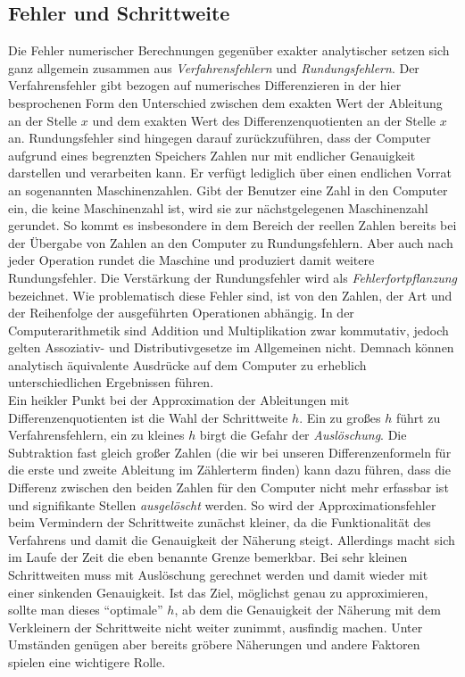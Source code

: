 \documentclass{scrartcl}
\begin{document}
\subsection{Fehler und Schrittweite}
\label{ssec:schrittweite}
Die Fehler numerischer Berechnungen gegenüber exakter analytischer setzen sich ganz allgemein zusammen aus \textit{Verfahrensfehlern} und \textit{Rundungsfehlern}.\cite{westermann} Der Verfahrensfehler gibt bezogen auf numerisches Differenzieren in der hier besprochenen Form den Unterschied zwischen dem exakten Wert der Ableitung an der Stelle $x$ und dem exakten Wert des Differenzenquotienten an der Stelle $x$ an. Rundungsfehler sind hingegen darauf zurückzuführen, dass der Computer aufgrund eines begrenzten Speichers Zahlen nur mit endlicher Genauigkeit darstellen und verarbeiten kann. Er verfügt lediglich über einen endlichen Vorrat an sogenannten Maschinenzahlen. Gibt der Benutzer eine Zahl in den Computer ein, die keine Maschinenzahl ist, wird sie zur nächstgelegenen Maschinenzahl gerundet. So kommt es insbesondere in dem Bereich der reellen Zahlen bereits bei der Übergabe von Zahlen an den Computer zu Rundungsfehlern. Aber auch nach jeder Operation rundet die Maschine und produziert damit weitere Rundungsfehler. Die Verstärkung der Rundungsfehler wird als \textit{Fehlerfortpflanzung} bezeichnet. Wie problematisch diese Fehler sind, ist von den Zahlen, der Art und der Reihenfolge der ausgeführten Operationen abhängig. In der Computerarithmetik sind Addition und Multiplikation zwar kommutativ, jedoch gelten Assoziativ- und Distributivgesetze im Allgemeinen nicht. Demnach können analytisch äquivalente Ausdrücke auf dem Computer zu erheblich unterschiedlichen Ergebnissen führen.\cite{nla} \\
Ein heikler Punkt bei der Approximation der Ableitungen mit Differenzenquotienten ist die Wahl der Schrittweite $h$. Ein zu großes $h$ führt zu Verfahrensfehlern, ein zu kleines $h$ birgt die Gefahr der \textit{Auslöschung}. Die Subtraktion fast gleich großer Zahlen (die wir bei unseren Differenzenformeln für die erste und zweite Ableitung im Zählerterm finden) kann dazu führen, dass die Differenz zwischen den beiden Zahlen für den Computer nicht mehr erfassbar ist und signifikante Stellen \textit{ausgelöscht} werden.\cite{am}
So wird der Approximationsfehler beim Vermindern der Schrittweite zunächst kleiner, da die Funktionalität des Verfahrens und damit die Genauigkeit der Näherung steigt.
Allerdings macht sich im Laufe der Zeit die eben benannte Grenze bemerkbar. Bei sehr kleinen Schrittweiten muss mit Auslöschung gerechnet werden und damit wieder mit einer sinkenden Genauigkeit.\cite{schneebeli}
Ist das Ziel, möglichst genau zu approximieren, sollte man dieses "`optimale"' $h$, ab dem die Genauigkeit der Näherung mit dem Verkleinern der Schrittweite nicht weiter zunimmt, ausfindig machen. Unter Umständen genügen aber bereits gröbere Näherungen und andere Faktoren spielen eine wichtigere Rolle. \\
\end{document}
